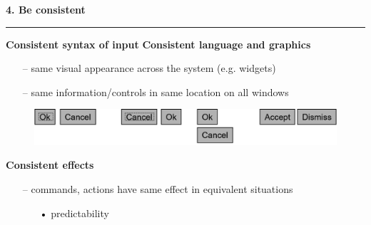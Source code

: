 \documentclass[pdf]{beamer}
\begin{document}
\begin{frame}
{\textbf{4. Be consistent}}{\textcolor{red}{\rule{12cm}{1.2pt}}}
	
	\vspace{-5px}\textbf{Consistent syntax of input} 
    \newline
    \newline
    \newline
	\textbf{Consistent language and graphics}
	\begin{itemize}
    	\item[--] same visual appearance across the system (e.g. widgets)
        \item[--] same information/controls in same location on all windows
 	\end{itemize}
	\begin{figure}
		\includegraphics[scale=0.50]{20_picture.png}
  	\end{figure}
    \textbf{Consistent effects}
        \begin{itemize}
    	\item[--] commands, actions have same effect in equivalent situations
			\begin{itemize}
        	\item[\textcolor{black}{•}] predictability
            \end{itemize}
        \end{itemize}
 
\end{frame}
\end{document}
